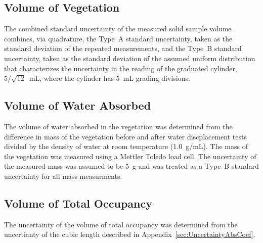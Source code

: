 \documentclass[12pt]{article}
\begin{document}
\subsection{Volume of Vegetation}
\label{ssec:VVegUncertainty}
The combined standard uncertainty of the measured solid sample volume combines, via quadrature, the Type~A standard uncertainty, taken as the standard deviation of the repeated measurements, and the Type~B standard uncertainty, taken as the standard deviation of the assumed uniform distribution that characterizes the uncertainty in the reading of the graduated cylinder, $5/\sqrt{12}$~mL, where the cylinder has 5~mL grading divisions.

\subsection{Volume of Water Absorbed}
\label{ssec:VWaterAbsorbedUncertainty}
The volume of water absorbed in the vegetation was determined from the difference in mass of the vegetation before and after water discplacement tests divided by the density of water at room temperature (1.0~g/mL). The mass of the vegetation was measured using a Mettler Toledo load cell. The uncertainty of the measured mass was assumed to be 5~\si{g} and was treated as a Type~B standard uncertainty for all mass measurments.

\subsection{Volume of Total Occupancy}
\label{ssec:VWaterAbsorbedUncertainty}
The uncertainty of the volume of total occupancy was determined from the uncertianty of the cubic length described in Appendix~\ref{sec:UncertaintyAbsCoef}.
\end{document}
